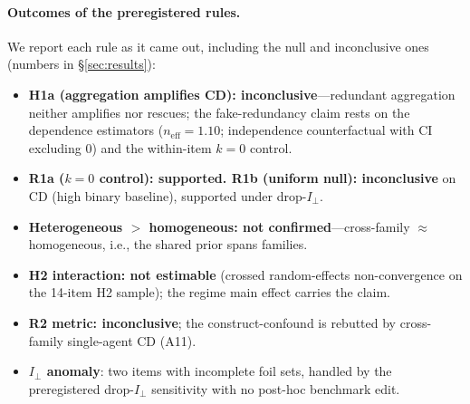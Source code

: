 \documentclass[acmsmall,screen,nonacm]{acmart}
\newcommand{\cd}{\textsf{CD}}
\newcommand{\iperp}{\ensuremath{I_\perp}}
\newcommand{\neff}{\ensuremath{n_{\mathrm{eff}}}}
\begin{document}
\paragraph{Outcomes of the preregistered rules.} We report each rule as it came out, including
the null and inconclusive ones (numbers in \S\ref{sec:results}):
\begin{itemize}
\item \textbf{H1a (aggregation amplifies \cd): inconclusive}---redundant aggregation neither
amplifies nor rescues; the fake-redundancy claim rests on the dependence estimators
($\neff{=}1.10$; independence counterfactual with CI excluding $0$) and the within-item $k{=}0$
control.
\item \textbf{R1a ($k{=}0$ control): supported. R1b (uniform null): inconclusive} on \cd{}
(high binary baseline), supported under drop-\iperp{}.
\item \textbf{Heterogeneous $>$ homogeneous: not confirmed}---cross-family $\approx$
homogeneous, i.e., the shared prior spans families.
\item \textbf{H2 interaction: not estimable} (crossed random-effects non-convergence on the
14-item H2 sample); the regime main effect carries the claim.
\item \textbf{R2 metric: inconclusive}; the construct-confound is rebutted by cross-family
single-agent \cd{} (A11).
\item \textbf{\iperp{} anomaly}: two items with incomplete foil sets, handled by the
preregistered drop-\iperp{} sensitivity with no post-hoc benchmark edit.
\end{itemize}
\end{document}

